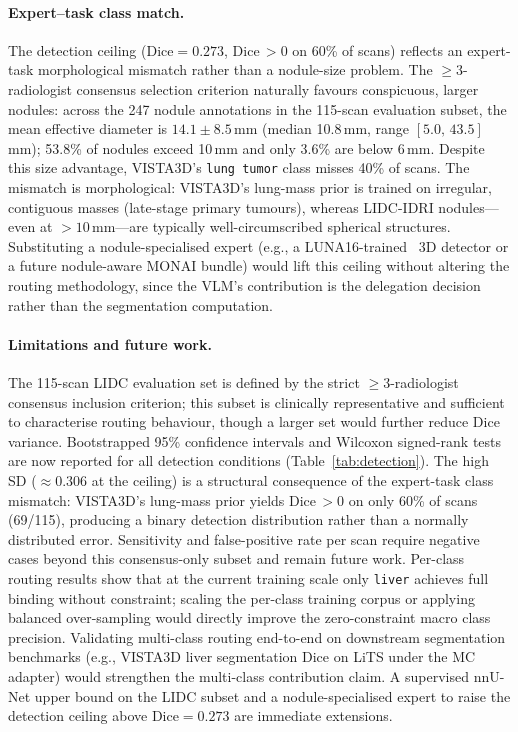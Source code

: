 \documentclass[lineno,referee,pdflatex,sn-mathphys-num]{sn-jnl}
\begin{document}
\paragraph{Expert--task class match.}
The detection ceiling ($\mathrm{Dice}=0.273$, Dice\,$>0$ on 60\% of
scans) reflects an expert-task morphological mismatch rather than a
nodule-size problem. The $\geq\!3$-radiologist consensus selection
criterion naturally favours conspicuous, larger nodules: across the 247
nodule annotations in the 115-scan evaluation subset, the mean effective
diameter is $14.1\pm8.5$\,mm (median 10.8\,mm, range
$[5.0,\,43.5]$\,mm); 53.8\% of nodules exceed 10\,mm and only 3.6\%
are below 6\,mm. Despite this size advantage, VISTA3D's \texttt{lung
tumor} class misses 40\% of scans. The mismatch is morphological:
VISTA3D's lung-mass prior is trained on irregular, contiguous masses
(late-stage primary tumours), whereas LIDC-IDRI nodules---even at
$>10$\,mm---are typically well-circumscribed spherical structures.
Substituting a nodule-specialised expert (e.g., a LUNA16-trained~\cite{luna16}
3D detector or a future nodule-aware MONAI bundle) would lift this
ceiling without altering the routing methodology, since the VLM's
contribution is the delegation decision rather than the segmentation
computation.

\paragraph{Limitations and future work.}
The 115-scan LIDC evaluation set is defined by the strict
$\geq$3-radiologist consensus inclusion criterion; this subset is
clinically representative and sufficient to characterise routing
behaviour, though a larger set would further reduce Dice variance.
Bootstrapped 95\% confidence intervals and Wilcoxon signed-rank tests
are now reported for all detection conditions (Table~\ref{tab:detection}).
The high SD (${\approx}0.306$ at the ceiling) is a structural consequence
of the expert-task class mismatch: VISTA3D's lung-mass prior yields
Dice\,$>0$ on only 60\% of scans (69/115), producing a binary detection
distribution rather than a normally distributed error. Sensitivity and
false-positive rate per scan require negative cases beyond this
consensus-only subset and remain future work. Per-class routing results
show that at the current training scale only \texttt{liver} achieves full
binding without constraint; scaling the per-class training corpus or
applying balanced over-sampling would directly improve the zero-constraint
macro class precision. Validating multi-class routing end-to-end on
downstream segmentation benchmarks (e.g., VISTA3D liver segmentation
Dice on LiTS under the MC adapter) would strengthen the multi-class
contribution claim. A supervised nnU-Net upper bound on the LIDC subset
and a nodule-specialised expert to raise the detection ceiling above
$\mathrm{Dice}=0.273$ are immediate extensions.
\end{document}

